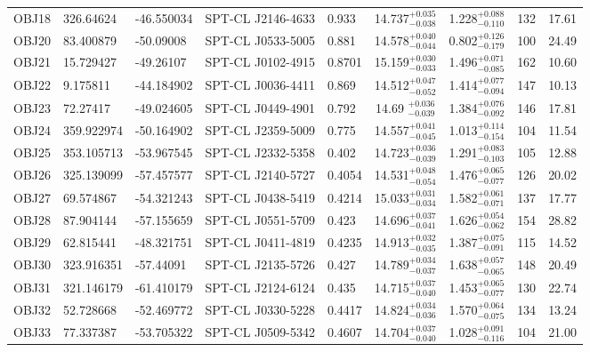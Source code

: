 \documentclass[apj,twocolumn]{emulateapj}
\begin{document}
{\begin{table}[h!]
\begin{tabular}{l l l l l c c c c}
 OBJ18 & 326.64624  & -46.550034 &  SPT-CL J2146-4633      & 0.933  & 14.737$^{+0.035}_{-0.038}$ & 1.228$^{+0.088}_{-0.110}$ &   132 & 17.61 \\
 OBJ20 & 83.400879  & -50.09008  &  SPT-CL J0533-5005      & 0.881  & 14.578$^{+0.040}_{-0.044}$ & 0.802$^{+0.126}_{-0.179}$ &   100 & 24.49 \\
 OBJ21 & 15.729427  & -49.26107  &  SPT-CL J0102-4915      & 0.8701 & 15.159$^{+0.030}_{-0.033}$ & 1.496$^{+0.071}_{-0.085}$ &   162 & 10.60 \\
 OBJ22 & 9.175811   & -44.184902 &  SPT-CL J0036-4411      & 0.869  & 14.512$^{+0.047}_{-0.052}$ & 1.414$^{+0.077}_{-0.094}$ &   147 & 10.13 \\
 OBJ23 & 72.27417   & -49.024605 &  SPT-CL J0449-4901      & 0.792  & 14.69 $^{+0.036}_{-0.039}$ & 1.384$^{+0.076}_{-0.092}$ &   146 & 17.81 \\
 OBJ24 & 359.922974 & -50.164902 &  SPT-CL J2359-5009      & 0.775  & 14.557$^{+0.041}_{-0.045}$ & 1.013$^{+0.114}_{-0.154}$ &   104 & 11.54 \\
 OBJ25 & 353.105713 & -53.967545 &  SPT-CL J2332-5358      & 0.402  & 14.723$^{+0.036}_{-0.039}$ & 1.291$^{+0.083}_{-0.103}$ &   105 & 12.88 \\
 OBJ26 & 325.139099 & -57.457577 &  SPT-CL J2140-5727      & 0.4054 & 14.531$^{+0.048}_{-0.054}$ & 1.476$^{+0.065}_{-0.077}$ &   126 & 20.02 \\
 OBJ27 & 69.574867  & -54.321243 &  SPT-CL J0438-5419      & 0.4214 & 15.033$^{+0.031}_{-0.034}$ & 1.582$^{+0.061}_{-0.071}$ &   137 & 17.77 \\
 OBJ28 & 87.904144  & -57.155659 &  SPT-CL J0551-5709      & 0.423  & 14.696$^{+0.037}_{-0.041}$ & 1.626$^{+0.054}_{-0.062}$ &   154 & 28.82 \\
 OBJ29 & 62.815441  & -48.321751 &  SPT-CL J0411-4819      & 0.4235 & 14.913$^{+0.032}_{-0.035}$ & 1.387$^{+0.075}_{-0.091}$ &   115 & 14.52 \\
 OBJ30 & 323.916351 & -57.44091  &  SPT-CL J2135-5726      & 0.427  & 14.789$^{+0.034}_{-0.037}$ & 1.638$^{+0.057}_{-0.065}$ &   148 & 20.49 \\
 OBJ31 & 321.146179 & -61.410179 &  SPT-CL J2124-6124      & 0.435  & 14.715$^{+0.037}_{-0.040}$ & 1.453$^{+0.065}_{-0.077}$ &   130 & 22.74 \\
 OBJ32 & 52.728668  & -52.469772 &  SPT-CL J0330-5228      & 0.4417 & 14.824$^{+0.034}_{-0.036}$ & 1.570$^{+0.064}_{-0.075}$ &   134 & 13.24 \\
 OBJ33 & 77.337387  & -53.705322 &  SPT-CL J0509-5342      & 0.4607 & 14.704$^{+0.037}_{-0.040}$ & 1.028$^{+0.091}_{-0.116}$ &   104 & 21.00 \\

\end{tabular}
\end{table}}
\end{document}
